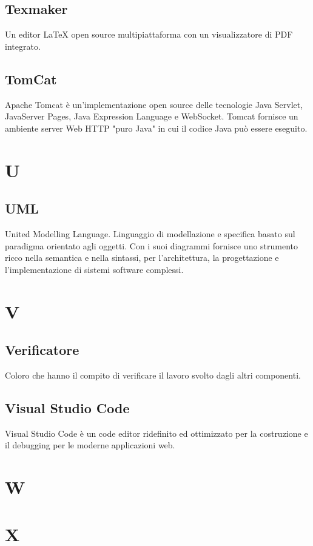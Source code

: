 \subsection*{Texmaker}
Un editor LaTeX open source multipiattaforma con un visualizzatore di PDF integrato.

\subsection*{TomCat}
Apache Tomcat è un'implementazione open source delle tecnologie Java Servlet, JavaServer Pages, Java Expression Language e WebSocket. Tomcat fornisce un ambiente server Web HTTP "puro Java" in cui il codice Java può essere eseguito.

\newpage
\section{U}

\subsection*{UML}
United Modelling Language. Linguaggio di modellazione e specifica basato sul paradigma orientato agli oggetti. Con i suoi diagrammi fornisce uno strumento  ricco nella semantica e nella sintassi, per l'architettura, la progettazione e l'implementazione di sistemi software complessi.

\newpage
\section{V}
\subsection*{Verificatore}
Coloro che hanno il compito di verificare il lavoro svolto dagli altri componenti.

\subsection*{Visual Studio Code}
Visual Studio Code è un code editor ridefinito ed ottimizzato per la costruzione e il debugging per le moderne applicazioni web.

\newpage
\section{W}


\newpage
\section{X}


